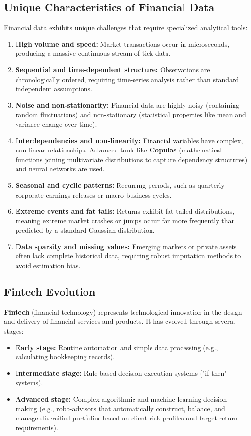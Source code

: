 \subsection{Unique Characteristics of Financial Data}
Financial data exhibits unique challenges that require specialized analytical tools:
\begin{enumerate}[noitemsep, topsep=2pt, parsep=0pt]
	\item \textbf{High volume and speed:} Market transactions occur in microseconds, producing a massive continuous stream of tick data.
	\item \textbf{Sequential and time-dependent structure:} Observations are chronologically ordered, requiring time-series analysis rather than standard independent assumptions.
	\item \textbf{Noise and non-stationarity:} Financial data are highly noisy (containing random fluctuations) and non-stationary (statistical properties like mean and variance change over time).
	\item \textbf{Interdependencies and non-linearity:} Financial variables have complex, non-linear relationships. Advanced tools like \textbf{Copulas} (mathematical functions joining multivariate distributions to capture dependency structures) and neural networks are used.
	\item \textbf{Seasonal and cyclic patterns:} Recurring periods, such as quarterly corporate earnings releases or macro business cycles.
	\item \textbf{Extreme events and fat tails:} Returns exhibit fat-tailed distributions, meaning extreme market crashes or jumps occur far more frequently than predicted by a standard Gaussian distribution.
	\item \textbf{Data sparsity and missing values:} Emerging markets or private assets often lack complete historical data, requiring robust imputation methods to avoid estimation bias.
\end{enumerate}

\subsection{Fintech Evolution}
\textbf{Fintech} (financial technology) represents technological innovation in the design and delivery of financial services and products. It has evolved through several stages:
\begin{itemize}[noitemsep, topsep=2pt, parsep=0pt]
	\item \textbf{Early stage:} Routine automation and simple data processing (e.g., calculating bookkeeping records).
	\item \textbf{Intermediate stage:} Rule-based decision execution systems ("if-then" systems).
	\item \textbf{Advanced stage:} Complex algorithmic and machine learning decision-making (e.g., robo-advisors that automatically construct, balance, and manage diversified portfolios based on client risk profiles and target return requirements).
\end{itemize}

